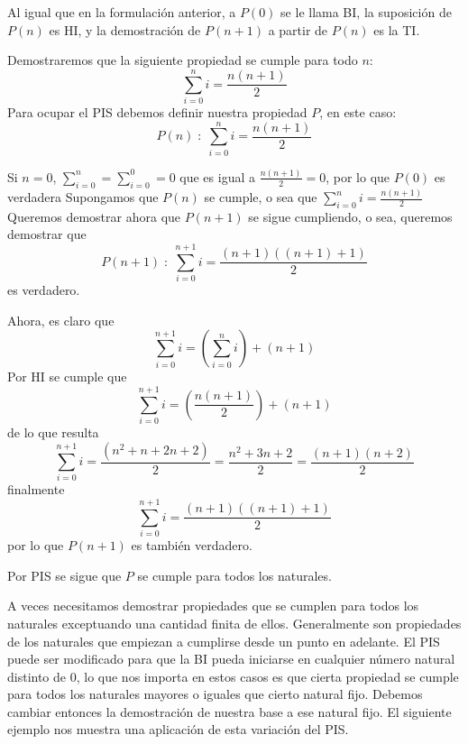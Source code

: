 Al igual que en la formulación anterior, a $P(0)$ se le llama BI, la suposición de $P(n)$ es HI, y la demostración de $P(n+1)$ a partir de $P(n)$ es la TI. 

\begin{ejemplo}
Demostraremos que la siguiente propiedad se cumple para todo $n$:
\[
\sum_{i=0}^{n}i=\frac{n(n+1)}{2}
\]
Para ocupar el PIS debemos definir nuestra propiedad $P$, en este caso:
\[
P(n)\;:\; \sum_{i=0}^{n}i=\frac{n(n+1)}{2}
\]

\begin{demostracion}
\begin{inducciondemo}
\BI Si $n=0$, $\sum_{i=0}^{n}=\sum_{i=0}^{0}=0$ que es igual a $\frac{n(n+1)}{2}=0$, por lo que $P(0)$ es verdadera
\HI Supongamos que $P(n)$ se cumple, o sea que $\sum_{i=0}^{n}i=\frac{n(n+1)}{2}$
\TI Queremos demostrar ahora que $P(n+1)$ se sigue cumpliendo, o sea, queremos demostrar que
\[
P(n+1)\;:\; \sum_{i=0}^{n+1}i=\frac{(n+1)((n+1)+1)}{2}
\]
es verdadero.

Ahora, es claro que
\[
\sum_{i=0}^{n+1}i=(\sum_{i=0}^{n}i)+(n+1)
\]
Por HI se cumple que
\[
\sum_{i=0}^{n+1}i=(\frac{n(n+1)}{2})+(n+1)
\]
de lo que resulta 
\[
\sum_{i=0}^{n+1}i=\frac{(n^2+n+2n+2)}{2}=\frac{n^2+3n+2}{2}=\frac{(n+1)(n+2)}{2}
\]
finalmente
\[
\sum_{i=0}^{n+1}i=\frac{(n+1)((n+1)+1)}{2}
\]
por lo que $P(n+1)$ es también verdadero.
\end{inducciondemo}
Por PIS se sigue que $P$ se cumple para todos los naturales.
\end{demostracion}
\end{ejemplo}

A veces necesitamos demostrar propiedades que se cumplen para todos los naturales exceptuando una cantidad finita de ellos.
Generalmente son propiedades de los naturales que empiezan a cumplirse desde un punto en adelante.
El PIS puede ser modificado para que la BI pueda iniciarse en cualquier número natural distinto de $0$, lo que nos importa en estos casos es que cierta propiedad se cumple para todos los naturales mayores o iguales que cierto natural fijo.
Debemos cambiar entonces la demostración de nuestra base a ese natural fijo.
El siguiente ejemplo nos muestra una aplicación de esta variación del PIS.

